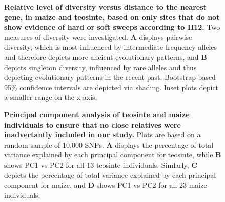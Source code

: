 \begin{figure}[h!]
\caption{ {\bf Relative level of diversity versus distance to the nearest gene, in maize and teosinte, based on only sites that do not show evidence of hard or soft sweeps according to H12.} Two measures of diversity were investigated. {\bf A} displays pairwise diversity,
which is most influenced by intermediate frequency alleles and therefore depicts more ancient evolutionary patterns, and {\bf B} depicts singleton diversity, influenced by rare alleles and thus depicting evolutionary patterns in the recent past. Bootstrap-based 95\% confidence intervals are depicted via shading. Inset plots depict a smaller range on the x-axis. \label{sFig:H12}}
\end{figure}



\begin{figure}[h!]
  \caption{ {\bf Principal component analysis of teosinte and maize individuals to ensure that no close relatives were inadvertantly included in our study.} Plots are based on a random sample of 10,000 SNPs. {\bf A} displays the percentage of total variance explained by each principal component for teosinte, while {\bf B} shows PC1 vs PC2 for all 13 teosinte individuals. Simlarly, {\bf C} depicts the percentage of total variance explained by each principal component for maize, and {\bf D} shows PC1 vs PC2 for all 23 maize individuals. \label{sFig:PCA}}
\end{figure}




